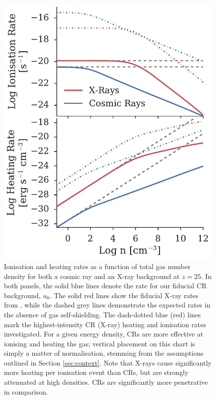 \documentclass{thesis}
\begin{document}
\begin{figure}
\begin{center}
\includegraphics[width=\columnwidth]{figures/khrates/khratesCR}
\caption{\label{fig:khratesCR}
Ionisation and heating rates as a function of total gas number density for both a cosmic ray and an X-ray background at $z=25$. 
In both panels, the solid blue lines denote the rate for our fiducial CR background, $u_0$. The solid red lines show the fiducial X-ray rates from \citet{Hummeletal2015}, while the dashed grey lines demonstrate the expected rates in the absence of gas self-shielding.  
The dash-dotted blue (red) lines mark the highest-intensity CR (X-ray) heating and ionisation rates investigated. 
For a given energy density, CRs are more effective at ionising and heating the gas; vertical placement on this chart is simply a matter of normalisation, stemming from the assumptions outlined in Section \ref{sec:context}. 
Note that X-rays cause significantly more heating per ionisation event than CRs, but are strongly attenuated at high densities. CRs are significantly more penetrative in comparison.%
} 
\end{center}
\end{figure}
\end{document}
